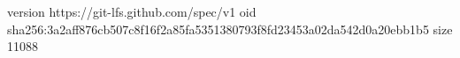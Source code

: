 version https://git-lfs.github.com/spec/v1
oid sha256:3a2aff876cb507c8f16f2a85fa5351380793f8fd23453a02da542d0a20ebb1b5
size 11088
